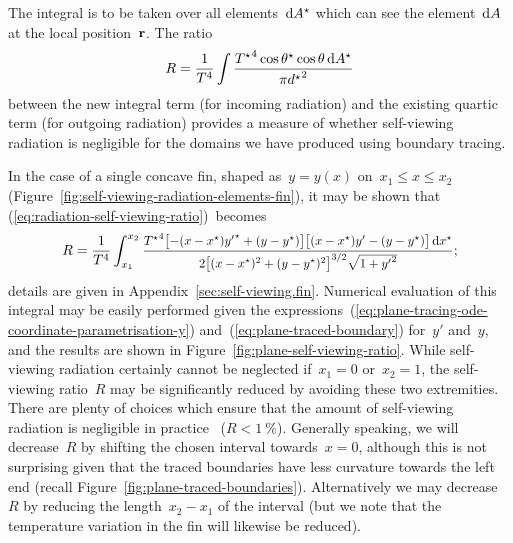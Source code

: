 The integral is to be taken over all elements~$\mathop{}\!\mathrm{d} A^\star$
which can see the element~$\mathop{}\!\mathrm{d} A$ at the local position~$\boldsymbol{\mathbf{r}}$.
The ratio
\begin{equation}
  \savecontent{
    R =
      \frac{1}{T^4}
      \int
        \frac{
          {T^\star}^4 \cos\theta^\star \cos\theta \td A^\star
        }{
          \pi {d^\star}^2
        }
  }{eq:radiation-self-viewing-ratio}
\end{equation}
between the new integral term (for incoming radiation)
and the existing quartic term (for outgoing radiation)
provides a measure of whether self-viewing radiation is negligible
for the domains we have produced using boundary tracing.

\begin{figure}
\end{figure}

In the case of a single concave fin,
shaped as~$y = y (x)$ on~$x_1 \le x \le x_2$
(Figure~\ref{fig:self-viewing-radiation-elements-fin}),
it may be shown that (\ref{eq:radiation-self-viewing-ratio})~becomes
\begin{equation}
  \savecontent{
    R =
      \frac{1}{T^4}
      \int_{x_1}^{x_2}
        \smallerfrac{
          {T^\star}^4
          \squarebr[\big]{-(x - x^\star) {y'}^\star + (y - y^\star)}
          \squarebr[\big]{(x - x^\star) y' - (y - y^\star)}
          \td x^\star
        }{
          2
          \squarebr[\big]{(x - x^\star)^2 + (y - y^\star)^2}^{3/2}
          \sqrt{1 + {y'}^2}
        }
  }{eq:plane-self-viewing-ratio};
\end{equation}
details are given in Appendix~\ref{sec:self-viewing.fin}.
Numerical evaluation of this integral may be easily performed
given the expressions~(\ref{eq:plane-tracing-ode-coordinate-parametrisation-y})
and~(\ref{eq:plane-traced-boundary}) for~$y'$ and~$y$,
and the results are shown in Figure~\ref{fig:plane-self-viewing-ratio}.
While self-viewing radiation certainly cannot be neglected
if~$x_1 = 0$ or~$x_2 = 1$,
the self-viewing ratio~$R$ may be significantly reduced
by avoiding these two extremities.
There are plenty of choices which ensure that
the amount of self-viewing radiation is negligible in practice~%
($R < \SI{1}{\percent}$).
Generally speaking,
we will decrease~$R$ by shifting the chosen interval towards~$x = 0$,
although this is not surprising
given that the traced boundaries have less curvature
towards the left end (recall Figure~\ref{fig:plane-traced-boundaries}).
Alternatively we may decrease~$R$
by reducing the length~$x_2 - x_1$ of the interval
(but we note that
the temperature variation in the fin will likewise be reduced).


